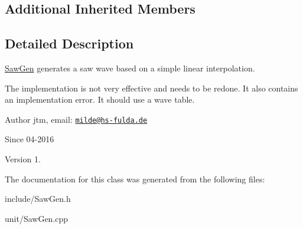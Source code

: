 \subsection*{Additional Inherited Members}


\subsection{Detailed Description}
\hyperlink{classunit_1_1SawGen}{Saw\-Gen} generates a saw wave based on a simple linear interpolation.

The implementation is not very effective and needs to be redone. It also contains an implementation error. It should use a wave table.

\begin{DoxyAuthor}{Author}
jtm, email\-:  \href{mailto:milde@hs-fulda.de}{\tt milde@hs-\/fulda.\-de} 
\end{DoxyAuthor}
\begin{DoxySince}{Since}
04-\/2016 
\end{DoxySince}
\begin{DoxyVersion}{Version}
1. 
\end{DoxyVersion}


The documentation for this class was generated from the following files\-:\begin{DoxyCompactItemize}
\item 
include/Saw\-Gen.\-h\item 
unit/Saw\-Gen.\-cpp\end{DoxyCompactItemize}
